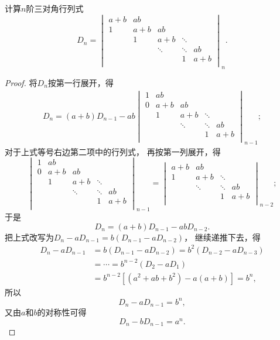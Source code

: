 \begin{example}\label{example:行列式的展开.三对角行列式}
计算\(n\)阶三对角行列式\begin{equation*}
	D_n = \begin{vmatrix}
		a+b & ab & \\
		1 & a+b & ab & \\
		& 1 & a + b & \ddots & \\
		& & \ddots & \ddots & ab \\
		& & & 1 & a+b \\
	\end{vmatrix}_n.
\end{equation*}
\begin{proof}
将\(D_n\)按第一行展开，得\begin{align*}
	D_n
	= (a+b) D_{n-1} - ab \begin{vmatrix}
		1 & ab \\
		0 & a+b & ab \\
		& 1 & a+b & \ddots \\
		& & \ddots & \ddots & ab \\
		& & & 1 & a+b \\
	\end{vmatrix}_{n-1};
\end{align*}
对于上式等号右边第二项中的行列式，
再按第一列展开，得\begin{equation*}
	\begin{vmatrix}
		1 & ab \\
		0 & a+b & ab \\
		& 1 & a+b & \ddots \\
		& & \ddots & \ddots & ab \\
		& & & 1 & a+b \\
	\end{vmatrix}_{n-1}
	= \begin{vmatrix}
		a+b & ab \\
		1 & a+b & \ddots \\
		& \ddots & \ddots & ab \\
		& & 1 & a+b \\
	\end{vmatrix}_{n-2};
\end{equation*}
于是\begin{equation*}
	D_n
	= (a+b) D_{n-1} - ab D_{n-2}.
\end{equation*}
把上式改写为\(D_n - a D_{n-1} = b(D_{n-1} - a D_{n-2})\)，
继续递推下去，得\begin{align*}
	D_n - a D_{n-1} &= b(D_{n-1} - a D_{n-2}) = b^2(D_{n-2} - a D_{n-3}) \\
	&= \dotsb = b^{n-2}(D_2 - a D_1) \\
	&= b^{n-2} [(a^2 + ab + b^2) - a(a+b)] = b^n,
\end{align*}
所以\begin{equation*}
	D_n - a D_{n-1} = b^n,
\end{equation*}
又由\(a\)和\(b\)的对称性可得\begin{equation*}
	D_n - b D_{n-1} = a^n.
\end{equation*}


\end{proof}
\end{example}
